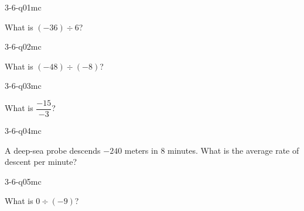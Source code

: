 

\begin{practiceQuestion}{3-6-q01}{mc}
\begin{questionText}
What is $(-36) \div 6$?
\end{questionText}
\end{practiceQuestion}

\begin{practiceQuestion}{3-6-q02}{mc}
\begin{questionText}
What is $(-48) \div (-8)$?
\end{questionText}
\end{practiceQuestion}

\begin{practiceQuestion}{3-6-q03}{mc}
\begin{questionText}
What is $\dfrac{-15}{-3}$?
\end{questionText}
\end{practiceQuestion}

\begin{practiceQuestion}{3-6-q04}{mc}
\begin{questionText}
A deep-sea probe descends $-240$ meters in $8$ minutes. What is the average rate of descent per minute?
\end{questionText}
\end{practiceQuestion}

\begin{practiceQuestion}{3-6-q05}{mc}
\begin{questionText}
What is $0 \div (-9)$?
\end{questionText}
\end{practiceQuestion}

